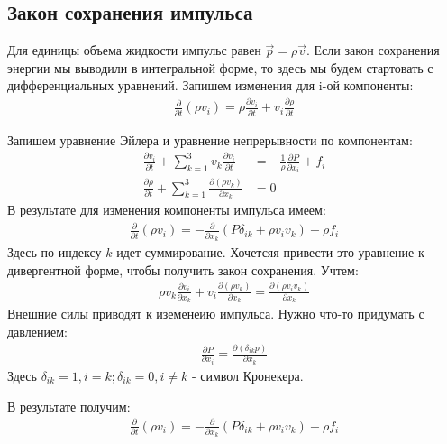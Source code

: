 \subsection{Закон сохранения импульса}
Для единицы объема жидкости импульс равен $ \vec { p } = \rho \vec { v } $. Если закон сохранения энергии мы выводили в интегральной форме, то здесь мы будем стартовать с дифференциальных уравнений. Запишем изменения для i-ой компоненты:
\begin{align*}
\frac { \partial } { \partial t } \left( \rho v _ { i } \right) = \rho \frac { \partial v _ { i } } { \partial t } + v _ { i } \frac { \partial \rho } { \partial t }
\end{align*}

Запишем уравнение Эйлера и уравнение непрерывности по компонентам:
\begin{align*}
\frac { \partial v _ { i } } { \partial t } + \sum _ { k = 1 } ^ { 3 } v _ { k } \frac { \partial v _ { i } } { \partial t } &= - \frac { 1 } { \rho } \frac { \partial P } { \partial x _ { i } } + f _ { i } \\
\frac { \partial \rho } { \partial t } + \sum _ { k = 1 } ^ { 3 } \frac { \partial \left( \rho v _ { k } \right) } { \partial x _ { k } } &= 0
\end{align*}
В результате для изменения компоненты импульса имеем:
\begin{align*}
\frac { \partial } { \partial t } \left( \rho v _ { i } \right) = - \frac { \partial } { \partial x _ { k } } \left( P \delta _ { i k } + \rho v _ { i } v _ { k } \right) + \rho f _ { i }
\end{align*}
Здесь по индексу $k$ идет суммирование. Хочетсяя привести это уравнение к дивергентной форме, чтобы получить закон сохранения. Учтем:
\begin{align*}
\rho v _ { k } \frac { \partial v _ { i } } { \partial x _ { k } } + v _ { i } \frac { \partial \left( \rho v _ { k } \right) } { \partial x _ { k } } = \frac { \partial \left( \rho v _ { i } v _ { k } \right) } { \partial x _ { k } }
\end{align*}
Внешние силы приводят к иземенеию импульса. Нужно что-то придумать с давлением:
\begin{align*}
\frac { \partial P } { \partial x _ { i } } = \frac { \partial \left( \delta _ { i k } p \right) } { \partial x _ { k } }
\end{align*}
Здесь $ \delta _ { i k } = 1 , i = k ; \delta _ { i k } = 0 , i \neq k $ - символ Кронекера.

В результате получим:
\begin{align*}
\frac { \partial } { \partial t } \left( \rho v _ { i } \right) = - \frac { \partial } { \partial x _ { k } } \left( P \delta _ { i k } + \rho v _ { i } v _ { k } \right) + \rho f _ { i }
\end{align*}

